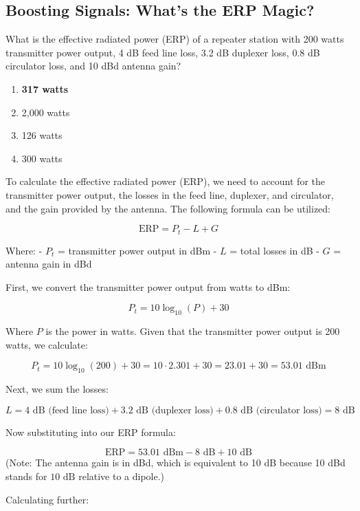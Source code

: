 \subsection{Boosting Signals: What's the ERP Magic?}

\begin{tcolorbox}[colback=gray!10, colframe=black, title=E9A06]  
What is the effective radiated power (ERP) of a repeater station with 200 watts transmitter power output, 4 dB feed line loss, 3.2 dB duplexer loss, 0.8 dB circulator loss, and 10 dBd antenna gain?  

\begin{enumerate}[label=\Alph*.]
    \item \textbf{317 watts}
    \item 2,000 watts
    \item 126 watts
    \item 300 watts
\end{enumerate} \end{tcolorbox}

To calculate the effective radiated power (ERP), we need to account for the transmitter power output, the losses in the feed line, duplexer, and circulator, and the gain provided by the antenna. The following formula can be utilized:

\[
\text{ERP} = P_t - L + G
\]

Where:
- \( P_t \) = transmitter power output in dBm
- \( L \) = total losses in dB
- \( G \) = antenna gain in dBd

First, we convert the transmitter power output from watts to dBm:

\[
P_t = 10 \log_{10}(P) + 30
\]

Where \( P \) is the power in watts. Given that the transmitter power output is 200 watts, we calculate:

\[
P_t = 10 \log_{10}(200) + 30 = 10 \cdot 2.301 + 30 = 23.01 + 30 = 53.01 \text{ dBm}
\]

Next, we sum the losses:

\[
L = 4 \text{ dB (feed line loss)} + 3.2 \text{ dB (duplexer loss)} + 0.8 \text{ dB (circulator loss)} = 8 \text{ dB}
\]

Now substituting into our ERP formula:

\[
\text{ERP} = 53.01 \text{ dBm} - 8 \text{ dB} + 10 \text{ dB} 
\]
(Note: The antenna gain is in dBd, which is equivalent to 10 dB because 10 dBd stands for \(10 \text{ dB}\) relative to a dipole.)

Calculating further:

